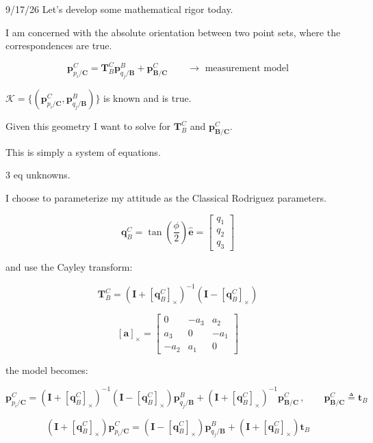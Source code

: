 \documentclass{article}
\newcommand{\vect}[1]{\mathbf{#1}}
\newcommand{\mat}[1]{\mathbf{#1}}
\newcommand{\TCB}{\mat{T}^C_{B}}
\newcommand{\pBjB}{\vect{p}^{\mathit{B}}_{q_{j}/\mathbf{B}}}
\newcommand{\pCiC}{\vect{p}^{\mathit{C}}_{p_{i}/\mathbf{C}}}
\newcommand{\pBCC}{\vect{p}^{\mathit{C}}_{\mathbf{B}/\mathbf{C}}}
\newcommand{\Kmat}{\mat{K}} %
\newcommand{\corrSet}{\mathcal{K}} %
\newcommand{\skewop}[1]{\left[#1\right]_{\times}} %
\newcommand{\qCB}{\vect{q}^{C}_{B}} %
\newcommand{\tB}{\vect{t}_B} %
\begin{document}
\begin{authornotes}{9/17/26}
Let's develop some mathematical rigor today.

I am concerned with the absolute orientation between two point sets, where the correspondences are true.

\begin{equation}
    \pCiC = \TCB \pBjB + \pBCC \qquad \rightarrow \text{ measurement model}
\end{equation}

$\corrSet = \{ (\pCiC, \pBjB) \}$ is known and is true.

Given this geometry I want to solve for $\TCB$ and $\pBCC$.

This is simply a system of equations.

3 eq  unknowns.

I choose to parameterize my attitude as the Classical Rodriguez parameters.

\begin{equation}
    \qCB = \tan\left( \frac{\phi}{2} \right) \hat{\vect{e}} = \begin{bmatrix} q_1 \\ q_2 \\ q_3 \end{bmatrix}
\end{equation}

and use the Cayley transform:

\begin{equation}
    \TCB = \left( \mat{I} + \skewop{\qCB} \right)^{-1} \left( \mat{I} - \skewop{\qCB} \right)
\end{equation}

\begin{equation}
    \skewop{\vect{a}} =
    \begin{bmatrix}
        0 & -a_3 & a_2 \\
        a_3 & 0 & -a_1 \\
        -a_2 & a_1 & 0
    \end{bmatrix}
\end{equation}

the model becomes:

\begin{equation}
    \pCiC = \left( \mat{I} + \skewop{\qCB} \right)^{-1} \left( \mat{I} - \skewop{\qCB} \right) \pBjB + \left( \mat{I} + \skewop{\qCB} \right)^{-1} \pBCC \, , \qquad \pBCC \triangleq \tB
\end{equation}

\begin{equation}
    \left( \mat{I} + \skewop{\qCB} \right) \pCiC = \left( \mat{I} - \skewop{\qCB} \right) \pBjB + \left( \mat{I} + \skewop{\qCB} \right) \tB
\end{equation}


\end{authornotes}
\end{document}
